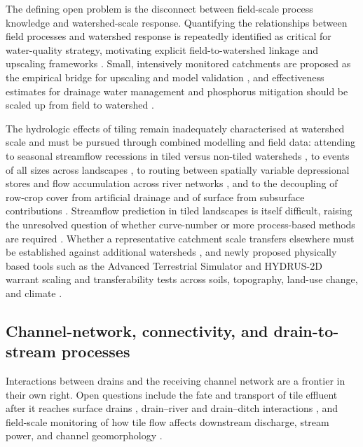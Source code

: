 The defining open problem is the disconnect between field-scale process
knowledge and watershed-scale response. Quantifying the relationships between
field processes and watershed response is repeatedly identified as critical for
water-quality strategy, motivating explicit field-to-watershed linkage and
upscaling frameworks \parencite{Williams2015,Williams2017,Wang2020b}. Small,
intensively monitored catchments are proposed as the empirical bridge for
upscaling and model validation \parencite{Kyllmar2023,Basu2010}, and
effectiveness estimates for drainage water management and phosphorus mitigation
should be scaled up from field to watershed
\parencite{Wang2021,Ross2016,Shedekar2021}.

The hydrologic effects of tiling remain inadequately characterised at watershed
scale and must be pursued through combined modelling and field data: attending
to seasonal streamflow recessions in tiled versus non-tiled watersheds
\parencite{Schilling2008,Schilling2012}, to events of all sizes across
landscapes \parencite{Sloan2017}, to routing between spatially variable
depressional stores and flow accumulation across river networks
\parencite{Sloan2016,Fonley2021}, and to the decoupling of row-crop cover from
artificial drainage and of surface from subsurface contributions
\parencite{BolandBrien2014}. Streamflow prediction in tiled landscapes is
itself difficult, raising the unresolved question of whether curve-number or
more process-based methods are required
\parencite{Wessel2022,Thomas2016,Rahman2014}. Whether a representative
catchment scale transfers elsewhere must be established against additional
watersheds \parencite{Basu2010,Thomas2016}, and newly proposed physically based
tools such as the Advanced Terrestrial Simulator and HYDRUS-2D warrant scaling
and transferability tests across soils, topography, land-use change, and
climate \parencite{Rathore2025,Naderi2025,Basu2010}.

\subsection{Channel-network, connectivity, and drain-to-stream processes}

Interactions between drains and the receiving channel network are a frontier in
their own right. Open questions include the fate and transport of tile effluent
after it reaches surface drains \parencite{Clement2017}, drain--river and
drain--ditch interactions \parencite{Grangeon2021}, and field-scale monitoring
of how tile flow affects downstream discharge, stream power, and channel
geomorphology \parencite{Zhou2025,Zhou2013}.

